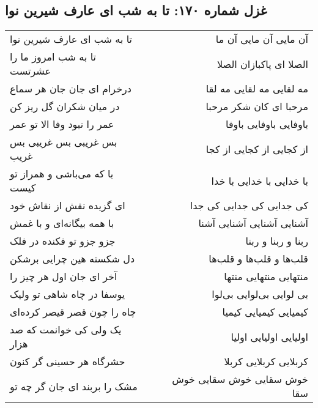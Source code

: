 \begin{center}
\section*{غزل شماره ۱۷۰: تا به شب ای عارف شیرین نوا}
\label{sec:0170}
\begin{longtable}{l p{0.5cm} r}
تا به شب ای عارف شیرین نوا
&&
آن مایی آن مایی آن ما
\\
تا به شب امروز ما را عشرتست
&&
الصلا ای پاکبازان الصلا
\\
درخرام ای جان جان هر سماع
&&
مه لقایی مه لقایی مه لقا
\\
در میان شکران گل ریز کن
&&
مرحبا ای کان شکر مرحبا
\\
عمر را نبود وفا الا تو عمر
&&
باوفایی باوفایی باوفا
\\
بس غریبی بس غریبی بس غریب
&&
از کجایی از کجایی از کجا
\\
با که می‌باشی و همراز تو کیست
&&
با خدایی با خدایی با خدا
\\
ای گزیده نقش از نقاش خود
&&
کی جدایی کی جدایی کی جدا
\\
با همه بیگانه‌ای و با غمش
&&
آشنایی آشنایی آشنایی آشنا
\\
جزو جزو تو فکنده در فلک
&&
ربنا و ربنا و ربنا
\\
دل شکسته هین چرایی برشکن
&&
قلب‌ها و قلب‌ها و قلب‌ها
\\
آخر ای جان اول هر چیز را
&&
منتهایی منتهایی منتها
\\
یوسفا در چاه شاهی تو ولیک
&&
بی لوایی بی‌لوایی بی‌لوا
\\
چاه را چون قصر قیصر کرده‌ای
&&
کیمیایی کیمیایی کیمیا
\\
یک ولی کی خوانمت که صد هزار
&&
اولیایی اولیایی اولیا
\\
حشرگاه هر حسینی گر کنون
&&
کربلایی کربلایی کربلا
\\
مشک را بربند ای جان گر چه تو
&&
خوش سقایی خوش سقایی خوش سقا
\\
\end{longtable}
\end{center}
